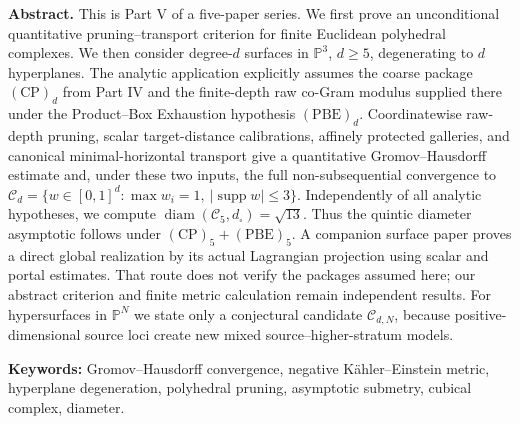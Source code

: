 \documentclass[a4paper,11pt]{ltjsarticle}
\numberwithin{equation}{section}
\theoremstyle{plain}
\theoremstyle{definition}
\theoremstyle{remark}
\begin{document}
\begin{center}
\begin{minipage}{0.93\textwidth}\small
\textbf{Abstract.}
This is Part V of a five-paper series.  We first prove an unconditional quantitative pruning--transport criterion for finite Euclidean polyhedral complexes.  We then consider degree-$d$ surfaces in $\mathbb P^3$, $d\ge5$, degenerating to $d$ hyperplanes.  The analytic application explicitly assumes the coarse package $\mathrm{(CP)}_d$ from Part IV and the finite-depth raw co-Gram modulus supplied there under the Product--Box Exhaustion hypothesis $\mathrm{(PBE)}_d$.  Coordinatewise raw-depth pruning, scalar target-distance calibrations, affinely protected galleries, and canonical minimal-horizontal transport give a quantitative Gromov--Hausdorff estimate and, under these two inputs, the full non-subsequential convergence to $\mathcal C_d=\{w\in[0,1]^d:\max w_i=1,\ |\operatorname{supp}w|\le3\}$.  Independently of all analytic hypotheses, we compute $\operatorname{diam}(\mathcal C_5,d_\square)=\sqrt{13}$.  Thus the quintic diameter asymptotic follows under $\mathrm{(CP)}_5+\mathrm{(PBE)}_5$.  A companion surface paper proves a direct global realization by its actual Lagrangian projection using scalar and portal estimates. That route does not verify the packages assumed here; our abstract criterion and finite metric calculation remain independent results. For hypersurfaces in $\mathbb P^N$ we state only a conjectural candidate $\mathcal C_{d,N}$, because positive-dimensional source loci create new mixed source--higher-stratum models.

\medskip
\textbf{Keywords:} Gromov--Hausdorff convergence, negative Kähler--Einstein metric, hyperplane degeneration, polyhedral pruning, asymptotic submetry, cubical complex, diameter.
\end{minipage}
\end{center}
\end{document}
